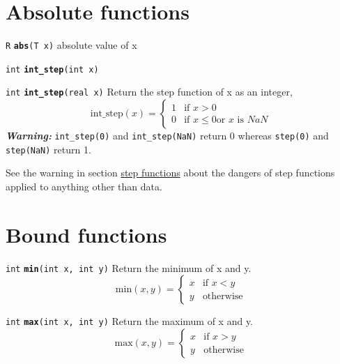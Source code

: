 \documentclass[
  10pt,
]{book}
\begin{document}
\hypertarget{absolute-functions}{%
\section{Absolute functions}\label{absolute-functions}}


\texttt{R} \textbf{\texttt{abs}}\texttt{(T\ x)}\newline
absolute value of x


\texttt{int} \textbf{\texttt{int\_step}}\texttt{(int\ x)}\newline


\texttt{int} \textbf{\texttt{int\_step}}\texttt{(real\ x)}\newline
Return the step function of x as an integer, \[ \mathrm{int\_step}(x)
= \begin{cases} 1 & \text{if } x > 0 \\ 0 & \text{if } x \leq 0 \text{
or } x \text{ is } NaN \end{cases} \] \emph{\textbf{Warning:}} \texttt{int\_step(0)} and
\texttt{int\_step(NaN)} return 0 whereas \texttt{step(0)} and \texttt{step(NaN)} return 1.

See the warning in section \protect\hyperlink{step-functions}{step functions} about the dangers of
step functions applied to anything other than data.

\hypertarget{bound-functions}{%
\section{Bound functions}\label{bound-functions}}


\texttt{int} \textbf{\texttt{min}}\texttt{(int\ x,\ int\ y)}\newline
Return the minimum of x and y. \[ \text{min}(x, y) = \begin{cases} x &
\text{if } x < y\\ y & \text{otherwise} \end{cases} \]


\texttt{int} \textbf{\texttt{max}}\texttt{(int\ x,\ int\ y)}\newline
Return the maximum of x and y. \[ \text{max}(x, y) = \begin{cases} x &
\text{if } x > y\\ y & \text{otherwise} \end{cases} \]
\end{document}
